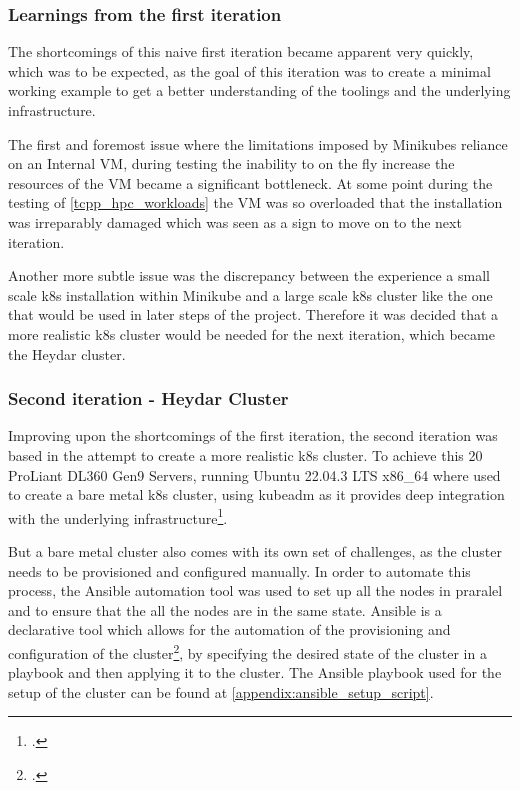 \subsubsection*{Learnings from the first iteration}

The shortcomings of this naive first iteration became apparent very quickly, 
which was to be expected, as the goal of this iteration was to create a minimal working example to get a better understanding of the toolings and the underlying infrastructure.

The first and foremost issue where the limitations imposed by Minikubes reliance on an Internal \ac{VM},
during testing the inability to on the fly increase the resources of the \ac{VM} became a significant bottleneck.
At some point during the testing of \ref{tcpp_hpc_workloads} the \ac{VM} was so overloaded that the installation was irreparably damaged which was seen as a sign to move on to the next iteration.

Another more subtle issue was the discrepancy between the experience a small scale \ac{k8s} installation within Minikube and a large scale \ac{k8s} cluster like the one that would be used in later steps of the project.
Therefore it was decided that a more realistic \ac{k8s} cluster would be needed for the next iteration, which became the Heydar cluster.

\subsubsection{Second iteration - Heydar Cluster}
\label{heydar_cluster}

Improving upon the shortcomings of the first iteration, the second iteration was based in the attempt to create a more realistic \ac{k8s} cluster.
To achieve this 20 ProLiant DL360 Gen9 Servers, running Ubuntu 22.04.3 LTS x86\_64 where used to create a bare metal \ac{k8s} cluster,
using kubeadm as it provides deep integration with the underlying infrastructure\footcite{CreatingClusterKubeadm}.

But a bare metal cluster also comes with its own set of challenges, as the cluster needs to be provisioned and configured manually.
In order to automate this process, the Ansible automation tool was used to set up all the nodes in praralel and to ensure that the all the nodes are in the same state.
Ansible is a declarative tool which allows for the automation of the provisioning and configuration of the cluster\footcite{Ansible2023}, by specifying the desired state of the cluster in a playbook and then applying it to the cluster.
The Ansible playbook used for the setup of the cluster can be found at \ref{appendix:ansible_setup_script}.

